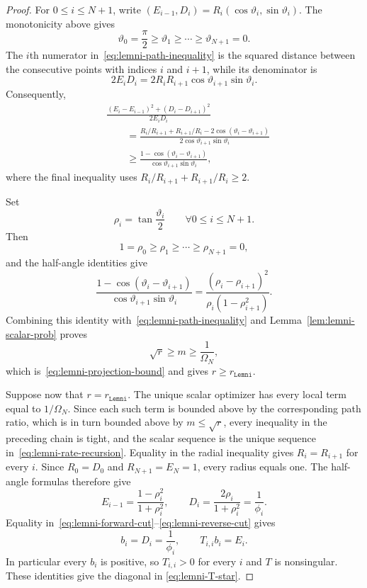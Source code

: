 \documentclass[10pt,a4paper]{amsart}
\begin{document}
\begin{proof}
For $0\leq i\leq N+1$, write $(E_{i-1},D_i)=R_i(\cos\vartheta_i,\sin\vartheta_i)$.
The monotonicity above gives
\[
    \vartheta_0=\frac\pi2
    \geq\vartheta_1\geq\cdots\geq
    \vartheta_{N+1}=0.
\]
The $i$th numerator in~\eqref{eq:lemni-path-inequality} is the squared
distance between the consecutive points with indices $i$ and $i+1$, while its
denominator is
\[
    2E_iD_i
    =2R_iR_{i+1}\cos\vartheta_{i+1}\sin\vartheta_i.
\]
Consequently,
\[
\begin{aligned}
&\frac{(E_i-E_{i-1})^2+(D_i-D_{i+1})^2}{2E_iD_i}\\
&\qquad=
\frac{R_i/R_{i+1}+R_{i+1}/R_i
-2\cos(\vartheta_i-\vartheta_{i+1})}
{2\cos\vartheta_{i+1}\sin\vartheta_i}\\
&\qquad\geq
\frac{1-\cos(\vartheta_i-\vartheta_{i+1})}
{\cos\vartheta_{i+1}\sin\vartheta_i},
\end{aligned}
\]
where the final inequality uses
$R_i/R_{i+1}+R_{i+1}/R_i\geq2$.

Set
\[
    \rho_i=\tan\frac{\vartheta_i}{2}
    \qquad \forall 0\leq i\leq N+1.
\]
Then
\[
    1=\rho_0\geq\rho_1\geq\cdots\geq\rho_{N+1}=0,
\]
and the half-angle identities give
\[
    \frac{1-\cos(\vartheta_i-\vartheta_{i+1})}
    {\cos\vartheta_{i+1}\sin\vartheta_i}
    =
    \frac{(\rho_i-\rho_{i+1})^2}
    {\rho_i(1-\rho_{i+1}^2)}.
\]
Combining this identity with~\eqref{eq:lemni-path-inequality} and
Lemma~\ref{lem:lemni-scalar-prob} proves
\[
\sqrt r\geq m\geq\frac1{\Omega_N},
\]
which is~\eqref{eq:lemni-projection-bound} and gives
$r\geq r_\mathtt{Lemni}$.

Suppose now that $r=r_\mathtt{Lemni}$. The unique scalar optimizer has every
local term equal to $1/\Omega_N$. Since each such term is bounded above by the
corresponding path ratio, which is in turn bounded above by $m\leq\sqrt r$,
every inequality in the preceding chain is tight, and the scalar sequence is
the unique sequence in~\eqref{eq:lemni-rate-recursion}. Equality in the radial inequality gives
$R_i=R_{i+1}$ for every $i$. Since $R_0=D_0$ and
$R_{N+1}=E_N=1$, every radius equals one. The half-angle formulas therefore
give
\begin{equation}\label{eq:lemni-equality-path}
    E_{i-1}=\frac{1-\rho_i^2}{1+\rho_i^2},
    \qquad
    D_i=\frac{2\rho_i}{1+\rho_i^2}=\frac1{\phi_i}.
\end{equation}
Equality in~\eqref{eq:lemni-forward-cut}--\eqref{eq:lemni-reverse-cut} gives
\[
    b_i=D_i=\frac1{\phi_i},
    \qquad
    T_{i,i}b_i=E_i.
\]
In particular every $b_i$ is positive, so $T_{i,i}>0$ for every
$i$ and $T$ is nonsingular. These identities give the diagonal in
\eqref{eq:lemni-T-star}.


\end{proof}
\end{document}
